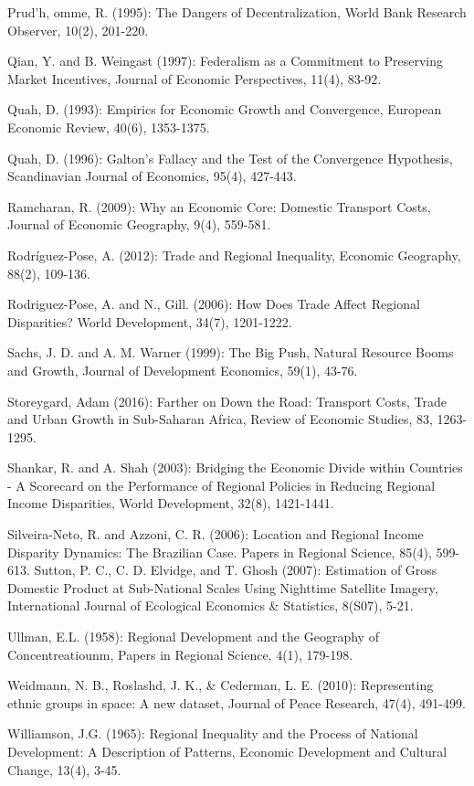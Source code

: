 \documentclass[10pt]{article}
\begin{document}
Prud'h, omme, R. (1995): The Dangers of Decentralization, World Bank Research Observer, 10(2), 201-220.

Qian, Y. and B. Weingast (1997): Federalism as a Commitment to Preserving Market Incentives, Journal of Economic Perspectives, 11(4), 83-92.

Quah, D. (1993): Empirics for Economic Growth and Convergence, European Economic Review, 40(6), 1353-1375.

Quah, D. (1996): Galton's Fallacy and the Test of the Convergence Hypothesis, Scandinavian Journal of Economics, 95(4), 427-443.

Ramcharan, R. (2009): Why an Economic Core: Domestic Transport Costs, Journal of Economic Geography, 9(4), 559-581.

Rodríguez-Pose, A. (2012): Trade and Regional Inequality, Economic Geography, 88(2), 109-136.

Rodriguez-Pose, A. and N., Gill. (2006): How Does Trade Affect Regional Disparities? World Development, 34(7), 1201-1222.

Sachs, J. D. and A. M. Warner (1999): The Big Push, Natural Resource Booms and Growth, Journal of Development Economics, 59(1), 43-76.

Storeygard, Adam (2016): Farther on Down the Road: Transport Costs, Trade and Urban Growth in Sub-Saharan Africa, Review of Economic Studies, 83, 1263-1295.

Shankar, R. and A. Shah (2003): Bridging the Economic Divide within Countries - A Scorecard on the Performance of Regional Policies in Reducing Regional Income Disparities, World Development, 32(8), 1421-1441.

Silveira-Neto, R. and Azzoni, C. R. (2006): Location and Regional Income Disparity Dynamics: The Brazilian Case. Papers in Regional Science, 85(4), 599-613. Sutton, P. C., C. D. Elvidge, and T. Ghosh (2007): Estimation of Gross Domestic Product at Sub-National Scales Using Nighttime Satellite Imagery, International Journal of Ecological Economics \& Statistics, 8(S07), 5-21.

Ullman, E.L. (1958): Regional Development and the Geography of Concentreatiounm, Papers in Regional Science, 4(1), 179-198.

Weidmann, N. B., Roslashd, J. K., \& Cederman, L. E. (2010): Representing ethnic groups in space: A new dataset, Journal of Peace Research, 47(4), 491-499.

Williamson, J.G. (1965): Regional Inequality and the Process of National Development: A Description of Patterns, Economic Development and Cultural Change, 13(4), 3-45.
\end{document}
